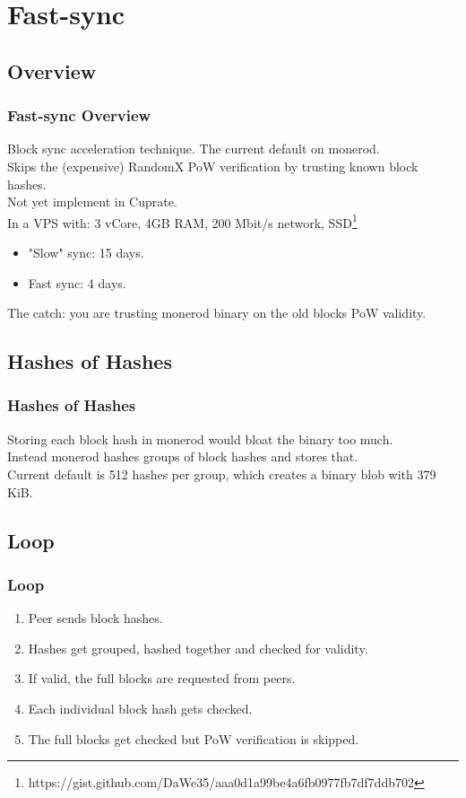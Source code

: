 \documentclass[aspectratio=169]{beamer}
\begin{document}
\section{Fast-sync}
\subsection{Overview}
\begin{frame}[fragile]
  \frametitle{Fast-sync Overview}
  Block sync acceleration technique. The current default on monerod.\\
  Skips the (expensive) RandomX PoW verification by trusting known block hashes.\\
  Not yet implement in Cuprate.\\
  \vspace{2\baselineskip}
  In a VPS with: 3 vCore, 4GB RAM, 200 Mbit/s network, SSD\footnote{https://gist.github.com/DaWe35/aaa0d1a99be4a6fb0977fb7df7ddb702}
  \begin{itemize}
    \item "Slow" sync: 15 days.
    \item Fast sync: 4 days.
  \end{itemize}
  \vspace{2\baselineskip}
  The catch: you are trusting monerod binary on the old blocks PoW validity.
\end{frame}

\subsection{Hashes of Hashes}
\begin{frame}[fragile]
  \frametitle{Hashes of Hashes}
  Storing each block hash in monerod would bloat the binary too much.\\
  \vspace{1\baselineskip}
  Instead monerod hashes groups of block hashes and stores that.\\
  \vspace{1\baselineskip}
  Current default is 512 hashes per group, which creates a binary blob with 379 KiB.\\
\end{frame}

\subsection{Loop}
\begin{frame}[fragile]
  \frametitle{Loop}
  \begin{enumerate}
    \item Peer sends block hashes.
    \item Hashes get grouped, hashed together and checked for validity.
    \item If valid, the full blocks are requested from peers.
    \item Each individual block hash gets checked.
    \item The full blocks get checked but PoW verification is skipped.
  \end{enumerate}
\end{frame}
\end{document}
